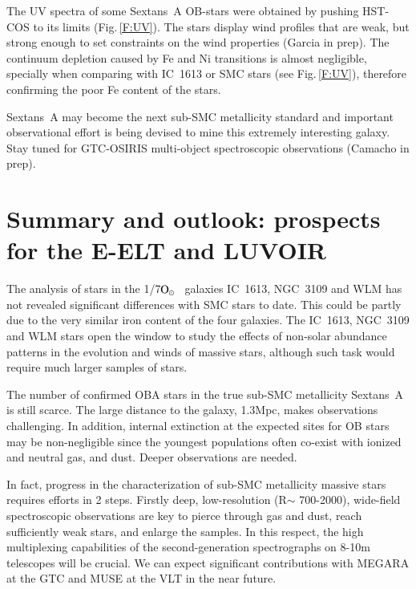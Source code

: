 \documentclass{iau}
\newcommand{\Osun}{$\rm O_{\odot}$}
\begin{document}
The UV spectra of some Sextans~A OB-stars were obtained by pushing HST-COS
to its limits (Fig.\,\ref{F:UV}). The stars display wind profiles that are weak, but
strong enough to set constraints on the wind properties (Garcia \etal in prep).
The continuum depletion caused by Fe and Ni transitions is almost negligible,
specially when comparing with IC~1613 or SMC stars (see Fig.\,\ref{F:UV}),
therefore confirming the poor Fe content of the stars.

Sextans~A may become the next sub-SMC metallicity standard %
and important observational effort is being devised to mine
this extremely interesting galaxy.
Stay tuned for GTC-OSIRIS multi-object spectroscopic observations (Camacho \etal in prep).




\section{Summary and outlook: prospects for the E-ELT and LUVOIR}

The analysis of stars in the 1/7\Osun~ galaxies
IC~1613, NGC~3109 and WLM has not revealed significant
differences with SMC stars to date. This could be partly due
to the very similar iron content of the four galaxies.
The IC~1613, NGC~3109 and WLM stars open the window
to study the effects of non-solar abundance patterns in the evolution
and winds of massive stars, although such task would require
much larger samples of stars.

The number of confirmed OBA stars
in the true sub-SMC metallicity Sextans~A is still scarce.
The large distance to the galaxy, 1.3Mpc, makes observations challenging.
In addition, internal extinction at the expected sites for OB stars
may be non-negligible since the youngest populations
often co-exist with ionized and neutral gas, and dust.
Deeper observations are needed.

In fact, progress in the characterization of sub-SMC metallicity massive
stars requires efforts in 2 steps. Firstly
deep, low-resolution (R$\sim$ 700-2000), wide-field spectroscopic observations
are key to pierce through gas and dust, reach sufficiently weak stars,
and enlarge the samples.
In this respect, the high multiplexing capabilities of
the second-generation spectrographs on 8-10m telescopes will be crucial.
We can expect significant contributions with MEGARA at the GTC \citep{MEGARA}
and MUSE at the VLT \citep{MUSE} in the near future.
\end{document}

